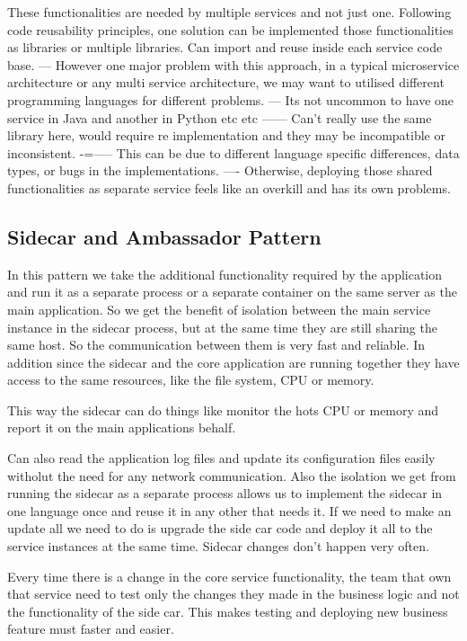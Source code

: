 \documentclass[a4paper, 11pt]{book}
\begin{document}
    These functionalities are needed by multiple services and not just one.
    Following code reusability principles, one solution can be implemented those functionalities as libraries or multiple libraries.
    Can import and reuse inside each service code base.
    --- However one major problem with this approach, in a typical microservice architecture or any multi service architecture, we may want to utilised different programming languages for different problems.
    --- Its not uncommon to have one service in Java and another in Python etc etc
    ------ Can't really use the same library here, would require re implementation and they may be incompatible or inconsistent.
    -=----- This can be due to different language specific differences, data types, or bugs in the implementations.
    ---- Otherwise, deploying those shared functionalities as separate service feels like an overkill and has its own problems.

    \subsection{Sidecar and Ambassador Pattern}
    In this pattern we take the additional functionality required by the application and run it as a separate process or a separate container on the same server as the main application.
    So we get the benefit of isolation between the main service instance in the sidecar process, but at the same time they are still sharing the same host.
    So the communication between them is very fast and reliable.
    In addition since the sidecar and the core application are running together they have access to the same resources, like the file system, CPU or memory.

    This way the sidecar can do things like monitor the hots CPU or memory and report it on the main applications behalf.

    Can also read the application log files and update its configuration files easily witholut the need for any network communication.
    Also the isolation we get from running the sidecar as a separate process allows us to implement the sidecar in one language once and reuse it in any other that needs it.
    If we need to make an update all we need to do is upgrade the side car code and deploy it all to the service instances at the same time.
    Sidecar changes don't happen very often.

    Every time there is a change in the core service functionality, the team that own that service need to test only the changes they made in the business logic and not the functionality of the side car.
    This makes testing and deploying new business feature must faster and easier.
\end{document}
